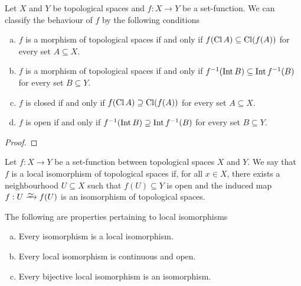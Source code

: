 \begin{proposition}\label{prop:classification-maps-interior-closure}
    Let \(X\) and \(Y\) be topological spaces and \(f: X \to Y\) be a
    set-function. We can classify the behaviour of \(f\) by the following conditions
    \begin{enumerate}[(a)]\setlength\itemsep{0em}
        \item \(f\) is a morphism of topological spaces if and only if \(f(\operatorname{Cl} A)
              \subseteq \operatorname{Cl}(f(A))\) for every set \(A \subseteq X\).
        \item \(f\) is a morphism of topological spaces if and only if \(f^{-1}(\operatorname{Int} B)
              \subseteq \operatorname{Int} f^{-1}(B)\) for every set \(B \subseteq Y\).
        \item \(f\) is closed if and only if \(f(\operatorname{Cl} A) \supseteq
              \operatorname{Cl}(f(A))\) for every set \(A \subseteq X\).
        \item \(f\) is open if and only if \(f^{-1}(\operatorname{Int} B) \supseteq \operatorname{Int} f^{-1}(B)\)
              for every set \(B \subseteq Y\).
    \end{enumerate}
\end{proposition}

\begin{proof}
\end{proof}

\begin{definition}
    \label{def:local-homeomorphism}
    Let \(f: X \to Y\) be a set-function between topological spaces \(X\) and
    \(Y\). We say that \(f\) is a local isomorphism of topological spaces if, for
    all \(x \in X\), there exists a neighbourhood \(U \subseteq X\) such that \(f(U)
    \subseteq Y\) is open and the induced map \(f: U \isoto f(U)\) is an isomorphism
    of topological spaces.
\end{definition}

\begin{proposition}\label{prop:properties-local-homeomorphism}
    The following are properties pertaining to local isomorphisms
    \begin{enumerate}[(a)]\setlength\itemsep{0em}
        \item Every isomorphism is a local isomorphism.
        \item Every local isomorphism is continuous and open.
        \item Every bijective local isomorphism is an isomorphism.
    \end{enumerate}
\end{proposition}

